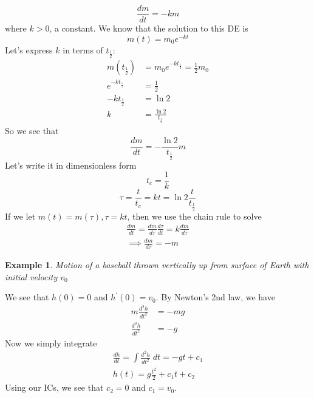 \documentclass{report}
\newtheorem{ex}{Example}[section]
\begin{document}
$$\frac{dm}{dt} = -km$$
where $k > 0$, a constant. We know that the solution to this DE is
$$m(t) = m_0e^{-kt}$$
Let's express $k$ in terms of $t_{\frac{1}{2}}$:
\begin{align}
m\left(t_\frac{1}{2}\right) &= m_0e^{-kt_{\frac{1}{2}}} = \frac{1}{2}m_0\\
e^{-kt_{\frac{1}{2}}} &= \frac{1}{2} \\
-kt_{\frac{1}{2}} &= \ln 2 \\
k &= \frac{\ln 2}{t_{\frac{1}{2}}}
\end{align}
So we see that
$$\frac{dm}{dt} = -\frac{\ln 2}{t_{\frac{1}{2}}}m$$
Let's write it in dimensionless form
$$t_c = \frac{1}{k}$$
$$\tau = \frac{t}{t_c} = kt = \ln 2 \frac{t}{t_{\frac{1}{2}}}$$
If we let $m(t) = m(\tau), \tau = kt$, then we use the chain rule to solve
\begin{align}
\frac{dm}{dt} = \frac{dm}{d\tau}\frac{d\tau}{dt} = k\frac{dm}{d\tau} \\
\implies \frac{dm}{d\tau} = -m
\end{align}
\begin{ex}
Motion of a baseball thrown vertically up from surface of Earth with initial velocity $v_0$
\end{ex}\noindent
We see that $h(0) = 0$ and $h^\prime(0) = v_0$. By Newton's 2nd law, we have
\begin{align}
m\frac{d^2h}{dt^2} &= -mg \\
\frac{d^2h}{dt^2} &= -g
\end{align}
Now we simply integrate
\begin{align*}
\frac{dh}{dt}  = \int \frac{d^2h}{dt^2} \; dt = -gt + c_1 \\
h(t) =g\frac{t^2}{2} + c_1t + c_2
\end{align*}
Using our ICs, we see that $c_2 = 0$ and $c_1 = v_0$.
\end{document}
